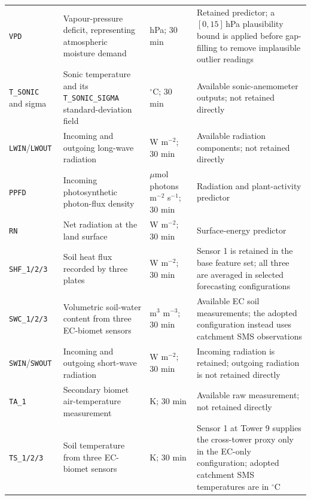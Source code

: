 {\begin{longtable}{p{2.7cm}p{4.5cm}p{2.5cm}p{4.8cm}}
\texttt{VPD} & Vapour-pressure deficit, representing atmospheric moisture demand & hPa; 30 min & Retained predictor; a $[0,15]$\,hPa plausibility bound
  is applied before gap-filling to remove implausible
  outlier readings \\
\texttt{T\_SONIC} and sigma & Sonic temperature and its \texttt{T\_SONIC\_SIGMA} standard-deviation field & $^{\circ}$C; 30 min & Available sonic-anemometer outputs; not retained directly \\
\texttt{LWIN}/\texttt{LWOUT} & Incoming and outgoing long-wave radiation & W m$^{-2}$; 30 min & Available radiation components; not retained directly \\
\texttt{PPFD} & Incoming photosynthetic photon-flux density & $\mu$mol photons m$^{-2}$ s$^{-1}$; 30 min & Radiation and plant-activity predictor \\
\texttt{RN} & Net radiation at the land surface & W m$^{-2}$; 30 min & Surface-energy predictor \\
\texttt{SHF\_1/2/3} & Soil heat flux recorded by three plates & W m$^{-2}$; 30 min & Sensor 1 is retained in the base feature set; all three are averaged in selected forecasting configurations \\
\texttt{SWC\_1/2/3} & Volumetric soil-water content from three EC-biomet sensors & m$^{3}$ m$^{-3}$; 30 min & Available EC soil measurements; the adopted configuration instead uses catchment SMS observations \\
\texttt{SWIN}/\texttt{SWOUT} & Incoming and outgoing short-wave radiation & W m$^{-2}$; 30 min & Incoming radiation is retained; outgoing radiation is not retained directly \\
\texttt{TA\_1} & Secondary biomet air-temperature measurement & K; 30 min & Available raw measurement; not retained directly \\
\texttt{TS\_1/2/3} & Soil temperature from three EC-biomet sensors & K; 30 min & Sensor 1 at Tower 9 supplies the cross-tower proxy only in the EC-only configuration; adopted catchment SMS temperatures are in $^{\circ}$C \\
\end{longtable}
}

